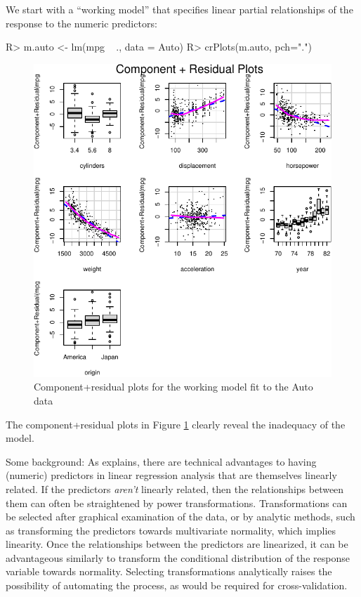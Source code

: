 \documentclass[
]{jss}
\begin{document}
We start with a ``working model'' that specifies linear partial
relationships of the response to the numeric predictors:

\begin{CodeChunk}
\begin{CodeInput}
R> m.auto <- lm(mpg ~ ., data = Auto)
R> crPlots(m.auto, pch=".")
\end{CodeInput}
\begin{figure}

{\centering \includegraphics[width=0.6\linewidth]{JSS-article-reduced-2_files/figure-latex/Auto-working-model-1} 

}

\caption[Component+residual plots for the working model fit to the Auto data]{Component+residual plots for the working model fit to the Auto data}\label{fig:Auto-working-model}
\end{figure}
\end{CodeChunk}

The component+residual plots in Figure \ref{fig:Auto-working-model}
clearly reveal the inadequacy of the model.

Some background: As \citet[Sec. 8.2]{Weisberg:2014} explains, there are
technical advantages to having (numeric) predictors in linear regression
analysis that are themselves linearly related. If the predictors
\emph{aren't} linearly related, then the relationships between them can
often be straightened by power transformations. Transformations can be
selected after graphical examination of the data, or by analytic
methods, such as transforming the predictors towards multivariate
normality, which implies linearity. Once the relationships between the
predictors are linearized, it can be advantageous similarly to transform
the conditional distribution of the response variable towards normality.
Selecting transformations analytically raises the possibility of
automating the process, as would be required for cross-validation.
\end{document}
